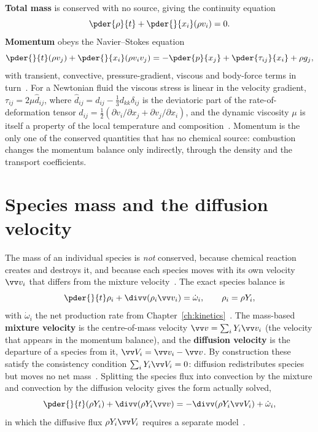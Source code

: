 \textbf{Total mass} is conserved with no source, giving the continuity equation
\begin{equation}
\pder{\rho}{t}+\pder{}{x_i}(\rho v_i)=0 .
\label{eq:continuity}
\end{equation}
\textbf{Momentum} obeys the Navier--Stokes equation
\begin{equation}
\pder{}{t}(\rho v_j)+\pder{}{x_i}(\rho v_i v_j)=-\pder{p}{x_j}+\pder{\tau_{ij}}{x_i}+\rho g_j ,
\label{eq:momentum}
\end{equation}
with transient, convective, pressure-gradient, viscous and body-force terms in turn~\cite{lecture8}. For a Newtonian fluid the viscous stress is linear in the velocity gradient, $\tau_{ij}=2\mu\hat d_{ij}$, where $\hat d_{ij}=d_{ij}-\tfrac13 d_{kk}\delta_{ij}$ is the deviatoric part of the rate-of-deformation tensor $d_{ij}=\tfrac12(\partial v_i/\partial x_j+\partial v_j/\partial x_i)$, and the dynamic viscosity $\mu$ is itself a property of the local temperature and composition~\cite{lecture8,white2016fluid}. Momentum is the only one of the conserved quantities that has no chemical source: combustion changes the momentum balance only indirectly, through the density and the transport coefficients.

\section{Species mass and the diffusion velocity}

The mass of an individual species is \emph{not} conserved, because chemical reaction creates and destroys it, and because each species moves with its own velocity $\vv v_i$ that differs from the mixture velocity~\cite{lecture8}. The exact species balance is
\begin{equation}
\pder{}{t}\rho_i+\divv(\rho_i \vv v_i)=\dot\omega_i,\qquad \rho_i=\rho Y_i,
\label{eq:species-exact}
\end{equation}
with $\dot\omega_i$ the net production rate from Chapter~\ref{ch:kinetics}~\cite{lecture8}. The mass-based \textbf{mixture velocity} is the centre-of-mass velocity $\vv v=\sum_i Y_i\vv v_i$ (the velocity that appears in the momentum balance), and the \textbf{diffusion velocity} is the departure of a species from it, $\vv V_i=\vv v_i-\vv v$. By construction these satisfy the consistency condition $\sum_i Y_i\vv V_i=0$: diffusion redistributes species but moves no net mass~\cite{lecture8,kuo2005conservation}. Splitting the species flux into convection by the mixture and convection by the diffusion velocity gives the form actually solved,
\begin{equation}
\pder{}{t}(\rho Y_i)+\divv(\rho Y_i\vv v)=-\divv(\rho Y_i\vv V_i)+\dot\omega_i ,
\label{eq:species-split}
\end{equation}
in which the diffusive flux $\rho Y_i\vv V_i$ requires a separate model~\cite{lecture8}.

